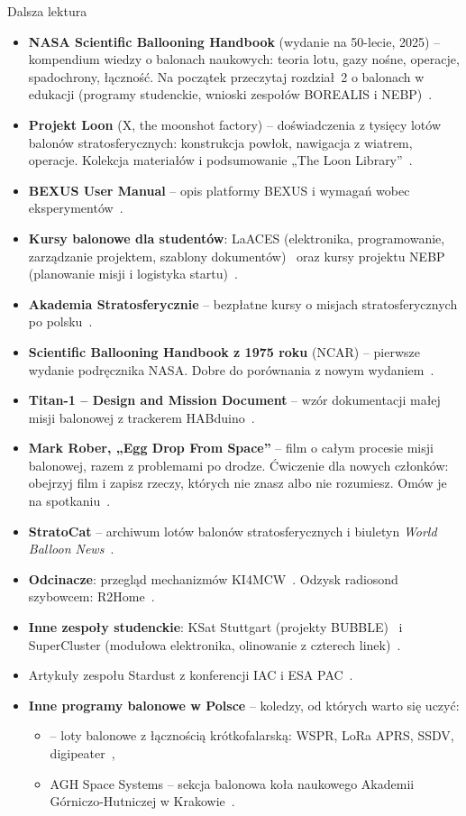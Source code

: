\begin{sekcja}{Dalsza lektura}
\begin{itemize}
  \item \textbf{NASA Scientific Ballooning Handbook} (wydanie na 50-lecie, 2025) -- kompendium wiedzy o balonach naukowych: teoria lotu, gazy nośne, operacje, spadochrony, łączność. Na początek przeczytaj rozdział~2 o balonach w edukacji (programy studenckie, wnioski zespołów BOREALIS i NEBP)~\cite{nasahb}.
  \item \textbf{Projekt Loon} (X, the moonshot factory) -- doświadczenia z tysięcy lotów balonów stratosferycznych: konstrukcja powłok, nawigacja z wiatrem, operacje. Kolekcja materiałów i podsumowanie „The Loon Library”~\cite{loon}.
  \item \textbf{BEXUS User Manual} -- opis platformy BEXUS i wymagań wobec eksperymentów~\cite{bexusmanual}.
  \item \textbf{Kursy balonowe dla studentów}: LaACES (elektronika, programowanie, zarządzanie projektem, szablony dokumentów)~\cite{laaces} oraz kursy projektu NEBP (planowanie misji i logistyka startu)~\cite{nebp}.
  \item \textbf{Akademia Stratosferycznie} -- bezpłatne kursy o misjach stratosferycznych po polsku~\cite{akademia}.
  \item \textbf{Scientific Ballooning Handbook z 1975 roku} (NCAR) -- pierwsze wydanie podręcznika NASA. Dobre do porównania z nowym wydaniem~\cite{nasahb1975}.
  \item \textbf{Titan-1 -- Design and Mission Document} -- wzór dokumentacji małej misji balonowej z trackerem HABduino~\cite{titan1}.
  \item \textbf{Mark Rober, „Egg Drop From Space”} -- film o całym procesie misji balonowej, razem z problemami po drodze. Ćwiczenie dla nowych członków: obejrzyj film i zapisz rzeczy, których nie znasz albo nie rozumiesz. Omów je na spotkaniu~\cite{rober}.
  \item \textbf{StratoCat} -- archiwum lotów balonów stratosferycznych i biuletyn \emph{World Balloon News}~\cite{stratocat}.
  \item \textbf{Odcinacze}: przegląd mechanizmów KI4MCW~\cite{ki4mcw}. Odzysk radiosond szybowcem: R2Home~\cite{r2home}.
  \item \textbf{Inne zespoły studenckie}: KSat Stuttgart (projekty BUBBLE)~\cite{ksat} i SuperCluster (modułowa elektronika, olinowanie z czterech linek)~\cite{supercluster}.
  \item Artykuły zespołu Stardust z konferencji IAC i ESA PAC~\cite{iac2023,pac2024}.
  \item \textbf{Inne programy balonowe w Polsce} -- koledzy, od których warto się uczyć:
  \begin{itemize}
    \item {} -- loty balonowe z łącznością krótkofalarską: WSPR, LoRa APRS, SSDV, digipeater~\cite{sp0lnd},
    \item AGH Space Systems -- sekcja balonowa koła naukowego Akademii Górniczo-Hutniczej w Krakowie~\cite{aghss}.
  \end{itemize}
\end{itemize}
\end{sekcja}
